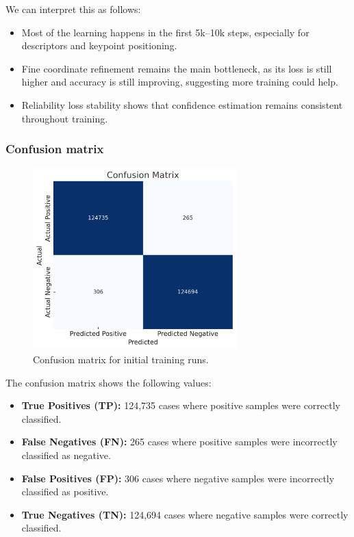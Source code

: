 We can interpret this as follows:
\begin{itemize}
    \item Most of the learning happens in the first 5k--10k steps, especially for
          descriptors and keypoint positioning.
    \item Fine coordinate refinement remains the main bottleneck, as its loss is still
          higher and accuracy is still improving, suggesting more training could help.
    \item Reliability loss stability shows that confidence estimation remains consistent
          throughout training.
\end{itemize}

\subsubsection{Confusion matrix}
\begin{figure}[H]
    \centering
    \includegraphics[width=0.7\textwidth]{ressources/confusion_matrix_1.png}
    \caption{Confusion matrix for initial training runs.}
    \label{fig:confusion_matrix_1}
\end{figure}
The confusion matrix shows the following values:
\begin{itemize}
    \item \textbf{True Positives (TP):} 124,735 cases where positive samples were correctly classified.
    \item \textbf{False Negatives (FN):} 265 cases where positive samples were incorrectly classified as negative.
    \item \textbf{False Positives (FP):} 306 cases where negative samples were incorrectly classified as positive.
    \item \textbf{True Negatives (TN):} 124,694 cases where negative samples were correctly classified.
\end{itemize}


